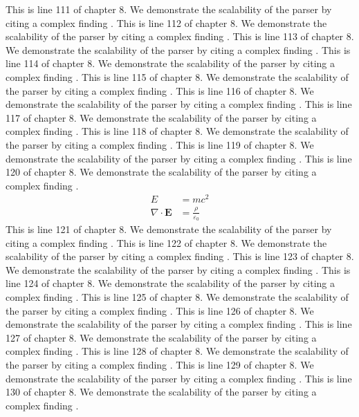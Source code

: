 This is line 111 of chapter 8. We demonstrate the scalability of the parser by citing a complex finding \cite{ref8_111}.
This is line 112 of chapter 8. We demonstrate the scalability of the parser by citing a complex finding \cite{ref8_112}.
This is line 113 of chapter 8. We demonstrate the scalability of the parser by citing a complex finding \cite{ref8_113}.
This is line 114 of chapter 8. We demonstrate the scalability of the parser by citing a complex finding \cite{ref8_114}.
This is line 115 of chapter 8. We demonstrate the scalability of the parser by citing a complex finding \cite{ref8_115}.
This is line 116 of chapter 8. We demonstrate the scalability of the parser by citing a complex finding \cite{ref8_116}.
This is line 117 of chapter 8. We demonstrate the scalability of the parser by citing a complex finding \cite{ref8_117}.
This is line 118 of chapter 8. We demonstrate the scalability of the parser by citing a complex finding \cite{ref8_118}.
This is line 119 of chapter 8. We demonstrate the scalability of the parser by citing a complex finding \cite{ref8_119}.
This is line 120 of chapter 8. We demonstrate the scalability of the parser by citing a complex finding \cite{ref8_120}.
\begin{align*}
  E &= mc^2 \\
  \nabla \cdot \mathbf{E} &= \frac{\rho}{\varepsilon_0}
\end{align*}
This is line 121 of chapter 8. We demonstrate the scalability of the parser by citing a complex finding \cite{ref8_121}.
This is line 122 of chapter 8. We demonstrate the scalability of the parser by citing a complex finding \cite{ref8_122}.
This is line 123 of chapter 8. We demonstrate the scalability of the parser by citing a complex finding \cite{ref8_123}.
This is line 124 of chapter 8. We demonstrate the scalability of the parser by citing a complex finding \cite{ref8_124}.
This is line 125 of chapter 8. We demonstrate the scalability of the parser by citing a complex finding \cite{ref8_125}.
This is line 126 of chapter 8. We demonstrate the scalability of the parser by citing a complex finding \cite{ref8_126}.
This is line 127 of chapter 8. We demonstrate the scalability of the parser by citing a complex finding \cite{ref8_127}.
This is line 128 of chapter 8. We demonstrate the scalability of the parser by citing a complex finding \cite{ref8_128}.
This is line 129 of chapter 8. We demonstrate the scalability of the parser by citing a complex finding \cite{ref8_129}.
This is line 130 of chapter 8. We demonstrate the scalability of the parser by citing a complex finding \cite{ref8_130}.
